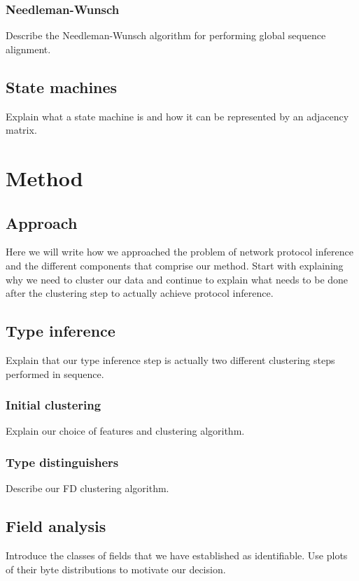 \documentclass[a4paper]{report}
\begin{document}
\subsection{Needleman-Wunsch}
Describe the Needleman-Wunsch algorithm for performing global sequence
alignment.

\section{State machines}
Explain what a state machine is and how it can be represented by an adjacency
matrix.

\chapter{Method}

\section{Approach}
Here we will write how we approached the problem of network protocol inference
and the different components that comprise our method. Start with explaining
why we need to cluster our data and continue to explain what needs to be done
after the clustering step to actually achieve protocol inference.

\section{Type inference}
Explain that our type inference step is actually two different clustering steps
performed in sequence.

\subsection{Initial clustering}
Explain our choice of features and clustering algorithm.

\subsection{Type distinguishers}
Describe our FD clustering algorithm.

\section{Field analysis}
Introduce the classes of fields that we have established as identifiable. Use
plots of their byte distributions to motivate our decision.
\end{document}
